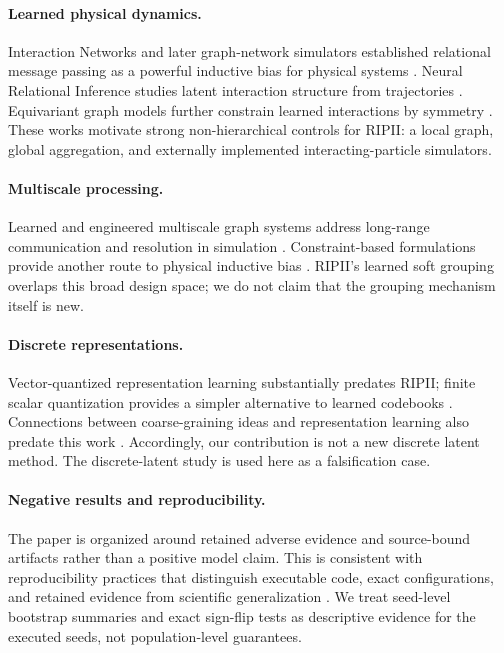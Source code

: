 \documentclass[10pt]{article}
\newcommand{\RIPII}{\textsc{RIPII}}
\begin{document}
\paragraph{Learned physical dynamics.}
Interaction Networks and later graph-network simulators established relational message passing as a powerful inductive bias for physical systems \citep{battaglia2016interaction,sanchez2018graph,sanchez2020simulate}. Neural Relational Inference studies latent interaction structure from trajectories \citep{kipf2018nri}. Equivariant graph models further constrain learned interactions by symmetry \citep{satorras2021egnn}. These works motivate strong non-hierarchical controls for \RIPII: a local graph, global aggregation, and externally implemented interacting-particle simulators.

\paragraph{Multiscale processing.}
Learned and engineered multiscale graph systems address long-range communication and resolution in simulation \citep{fortunato2022multiscale,cao2023bistride}. Constraint-based formulations provide another route to physical inductive bias \citep{rubanova2022constraint}. \RIPII's learned soft grouping overlaps this broad design space; we do not claim that the grouping mechanism itself is new.

\paragraph{Discrete representations.}
Vector-quantized representation learning substantially predates \RIPII \citep{vandenoord2017vq}; finite scalar quantization provides a simpler alternative to learned codebooks \citep{mentzer2023fsq}. Connections between coarse-graining ideas and representation learning also predate this work \citep{mehta2014rg}. Accordingly, our contribution is not a new discrete latent method. The discrete-latent study is used here as a falsification case.

\paragraph{Negative results and reproducibility.}
The paper is organized around retained adverse evidence and source-bound artifacts rather than a positive model claim. This is consistent with reproducibility practices that distinguish executable code, exact configurations, and retained evidence from scientific generalization \citep{pineau2021reproducibility}. We treat seed-level bootstrap summaries and exact sign-flip tests as descriptive evidence for the executed seeds, not population-level guarantees.
\end{document}
